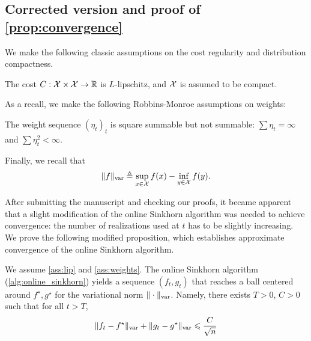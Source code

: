 \subsection{Corrected version and proof of \autoref{prop:convergence}}

\makeatletter
\newcommand{\setpropositiontag}[1]{%
  \let\oldtheproposition\theproposition%
  \renewcommand{\theproposition}{#1}%
  \g@addto@macro\endproposition{%
    \addtocounter{proposition}{-1}%
    \global\let\theproposition\oldtheproposition}%
  }
\makeatother


We make the following classic assumptions on the cost regularity and distribution compactness.

\begin{assumption}\label{ass:lip}
    The cost $C: \mathcal{X} \times \mathcal{X} \to \mathbb{R}$ is $L$-lipschitz, and $\mathcal{X}$ is assumed to be compact.
\end{assumption}
As a recall, we make the following Robbins-Monroe assumptions on weights:
\begin{assumption}\label{ass:weights}
    The weight sequence ${(\eta_t)}_t$ is square summable but not summable: 
    $\sum \eta_t = \infty$ and $\sum \eta_t^2 < \infty$.
\end{assumption}
Finally, we recall that
\begin{equation}
    \Vert f \Vert_{\text{\upshape var}} \triangleq \sup_{x \in \mathcal{X}} f(x) - \inf_{y \in \mathcal{X}} f(y).
\end{equation}

After submitting the manuscript and checking our proofs, it became apparent that a slight modification of the online Sinkhorn algorithm was needed to achieve convergence: the number of realizations used at $t$ has to be slightly increasing. We prove the following modified proposition, which establishes approximate convergence of the online Sinkhorn algorithm.

\setpropositiontag{4 bis}
\begin{proposition}\label{prop:convergence_bis}
    We assume \autoref{ass:lip} and \ref{ass:weights}. The online Sinkhorn algorithm (\autoref{alg:online_sinkhorn}) yields a sequence $(f_t, g_t)$ that reaches a
    ball centered around $f^\star, g^\star$ for the variational norm $\Vert
    \cdot \Vert_{\text{\upshape var}}$. Namely, there exists $T > 0$, $C > 0$ such that for all $t > T$,
    \begin{equation}
        \Vert f_t - f^\star \Vert_{\text{\upshape var}}
        + \Vert g_t - g^\star \Vert_{\text{\upshape var}} \leqslant \frac{C}{\sqrt{n}} 
    \end{equation}
\end{proposition}

